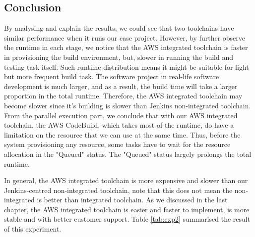 \subsection{Conclusion}
By analysing and explain the results, we could see that two toolchains have similar performance when it runs our case project. However, by further observe the runtime in each stage, we notice that the AWS integrated toolchain is faster in provisioning the build environment, but, slower in running the build and testing task itself. Such runtime distribution means it might be suitable for light but more frequent build task. 
The software project in real-life software development is much larger, and as a result, the build time will take a larger proportion in the total runtime. Therefore, the AWS integrated toolchain may become slower since it's building is slower than Jenkins non-integrated toolchain.
From the parallel execution part, we conclude that with our AWS integrated toolchain, the AWS CodeBuild, which takes most of the runtime, do have a limitation on the resource that we can use at the same time. Thus, before the system provisioning any resource, some tasks have to wait for the resource allocation in the "Queued" status. The "Queued" status largely prolongs the total runtime. 
\par
In general, the AWS integrated toolchain is more expensive and slower than our Jenkins-centred non-integrated toolchain, note that this does not mean the non-integrated is better than integrated toolchain. As we discussed in the last chapter, the AWS integrated toolchain is easier and faster to implement, is more stable and with better customer support. Table \ref{tab:exp2} summarised the result of this experiment.
